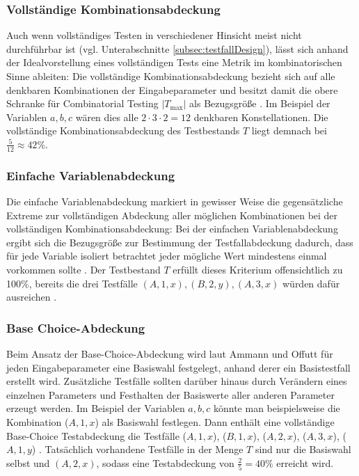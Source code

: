 \subsubsection{Vollständige Kombinationsabdeckung}\label{subsub:VollständigeAbdeckung}

Auch wenn vollständiges Testen in verschiedener Hinsicht meist nicht durchführbar ist (vgl. Unterabschnitte \ref{subsec:testfallDesign}), lässt sich anhand der Idealvorstellung eines vollständigen Tests eine Metrik im kombinatorischen Sinne ableiten: Die vollständige Kombinationsabdeckung bezieht sich auf alle denkbaren Kombinationen der Eingabeparameter und besitzt damit die obere Schranke für Combinatorial Testing $|T_{\max}|$ als Bezugsgröße \cite[S. 160]{ammann2008introduction}. Im Beispiel der Variablen $a, b, c$ wären dies alle $2 \cdot 3 \cdot 2 = 12$ denkbaren Konstellationen. Die vollständige Kombinationsabdeckung des Testbestands $T$ liegt demnach bei $\frac{5}{12} \approx 42 \%$.

\subsubsection{Einfache Variablenabdeckung}

Die einfache Variablenabdeckung markiert in gewisser Weise die gegensätzliche Extreme zur vollständigen Abdeckung aller möglichen Kombinationen bei der vollständigen Kombinationsabdeckung: Bei der einfachen Variablenabdeckung ergibt sich die Bezugsgröße zur Bestimmung der Testfallabdeckung dadurch, dass für jede Variable isoliert betrachtet jeder mögliche Wert mindestens einmal vorkommen sollte \cite[S. 160 f.]{ammann2008introduction}. Der Testbestand $T$ erfüllt dieses Kriterium offensichtlich zu 100\%, bereits die drei Testfälle $(A, 1, x), (B, 2, y), (A, 3, x)$ würden dafür ausreichen \cite[S. 160 f.]{ammann2008introduction}. 

\subsubsection{Base Choice-Abdeckung}\label{subsub:BaseChoice}

Beim Ansatz der Base-Choice-Abdeckung wird laut Ammann und Offutt \cite[S. 162]{ammann2008introduction} für jeden Eingabeparameter eine Basiswahl festgelegt, anhand derer ein Basistestfall erstellt wird. Zusätzliche Testfälle sollten darüber hinaus durch Verändern eines einzelnen Parameters und Festhalten der Basiswerte aller anderen Parameter erzeugt werden. Im Beispiel der Variablen $a,b,c$ könnte man beispielsweise die Kombination ($A,1,x$) als Basiswahl festlegen. Dann enthält eine vollständige Base-Choice Testabdeckung die Testfälle ($A,1,x$), ($B,1,x$), ($A,2,x$), ($A,3,x$), ($A,1,y$) \cite[S. 162]{ammann2008introduction}. Tatsächlich vorhandene Testfälle in der Menge $T$ sind nur die Basiswahl selbst und $(A,2,x)$, sodass eine Testabdeckung von $\frac{2}{5} = 40 \%$ erreicht wird.

